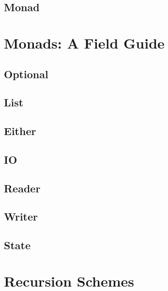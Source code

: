 \documentclass{book}
\begin{document}
\blindtext%

\section{Monad}

\blindtext%

\chapter{Monads: A Field Guide}

\section{Optional}

\blindtext%

\section{List}

\blindtext%

\section{Either}

\blindtext%

\section{IO}

\blindtext%

\section{Reader}

\blindtext%

\section{Writer}

\blindtext%

\section{State}

\blindtext%

\chapter{Recursion Schemes}\label{part:recursion}
\end{document}
